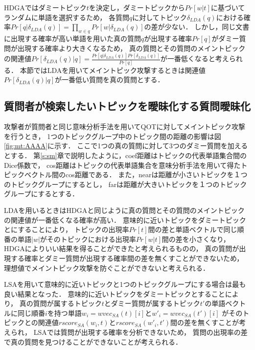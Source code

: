 \documentclass[master]{suribt}
\theoremstyle{definition}
\begin{document}
 HDGAではダミートピック$t$を決定し，ダミートピックから$Pr[w|t]$に基づいてランダムに単語を選択するため，
 各質問$q$に対してトピック$\delta_{LDA}(q)$における確率$Pr[q|\delta_{LDA}(q)] = \prod_{w \in q}Pr[w|\delta_{LDA}(q)]$の差が少ない．
 しかし，同じ文書に出現する確率が高い単語を用いた真の質問$q$が出現する確率$Pr[q]$がダミー質問が出現する確率より大きくなるため，
 真の質問とその質問のメイントピックの関連値$Pr[\delta_{LDA}(q)|q]=\frac{Pr[q|\delta_{LDA}(q)]Pr[\delta_{LDA}(q)]}{Pr[q]}$が一番低くなると考えられる．
 本節ではLDAを用いてメイントピック攻撃するときは関連値$Pr[\delta_{LDA}(q)|q]$が一番低い質問を真の質問とする．


 \subsection{質問者が検索したいトピックを曖昧化する質問曖昧化}
 攻撃者が質問者と同じ意味分析手法を用いてQOTに対してメイントピック攻撃を行うとき，
 1つのトピックグループ中のトピック間の距離の影響は図\ref{fig:mt:AAAA}に示す．
 ここで1つの真の質問に対して3つのダミー質問を加えるとする．
 第\ref{s:sm}章で説明したように，coef距離はトピックの代表単語集合間のDice係数で，
 cos距離はトピックの代表単語集合を意味分析手法を用いて得たトピックベクトル間のcos距離である．
 また，nearは距離が小さいトピックを１つのトピックグループにするとし，
 farは距離が大きいトピックを１つのトピックグループにするとする．

 LDAを用いるときはHDGAと同じように真の質問とその質問のメイントピックの関連値が一番低くなる確率が高い．
 意味的に近いトピックをダミートピックとにすることにより，
 トピックの出現率$Pr[t]$間の差と単語ベクトルで同じ順番の単語$|w|$がそのトピックにおける出現率$Pr[w|t]$間の差を小さくなり，
 HDGAによりいい結果を得ることができたと考えられるものの，
 真の質問が出現する確率とダミー質問が出現する確率間の差を無くすことができないため，
 理想値でメイントピック攻撃を防ぐことができないと考えられる．
 
 LSAを用いて意味的に近いトピックと1つのトピックグループにする場合は最も良い結果となった．
 意味的に近いトピックをダミートピックとすることにより，
 真の質問が属するトピック$t$とダミー質問が属するトピック$t'$の単語ベクトルに同じ順番$i$を持つ単語$w_i = wvec_{SA}(t)[i]$と$w'_i = wvec_{SA}(t')[i]$
 がそのトピックとの関連値$rscore_{SA}(w_i,t)$と$rscore_{SA}(w'_i,t')$間の差を無くすことが考えられ，
 LSAでは質問が出現する確率を分析できないため，
 質問の出現率の差で真の質問を見つけることができないことが考えられる． 
\end{document}
